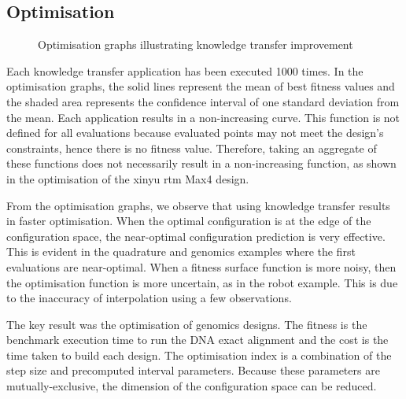 \documentclass[10pt,a4paper]{article}
\begin{document}
\subsection{Optimisation}

\begin{figure}[H]
	 \begin{center}
	\end{center}
	\caption{Optimisation graphs illustrating knowledge transfer improvement}
	\label{fig:subfigures}
\end{figure}

Each knowledge transfer application has been executed 1000 times. In the optimisation graphs, the solid lines represent the mean of best fitness values and the shaded area represents the confidence interval of one standard deviation from the mean. Each application results in a non-increasing curve. This function is not defined for all evaluations because evaluated points may not meet the design's constraints, hence there is no fitness value. Therefore, taking an aggregate of these functions does not necessarily result in a non-increasing function, as shown in the optimisation of the xinyu rtm Max4 design.

From the optimisation graphs, we observe that using knowledge transfer results in faster optimisation. When the optimal configuration is at the edge of the configuration space, the near-optimal configuration prediction is very effective. This is evident in the quadrature and genomics examples where the first evaluations are near-optimal. When a fitness surface function is more noisy, then the optimisation function is more uncertain, as in the robot example. This is due to the inaccuracy of interpolation using a few observations.

The key result was the optimisation of genomics designs. The fitness is the benchmark execution time to run the DNA exact alignment and the cost is the time taken to build each design. The optimisation index is a combination of the step size and precomputed interval parameters. Because these parameters are mutually-exclusive, the dimension of the configuration space can be reduced.
\end{document}
